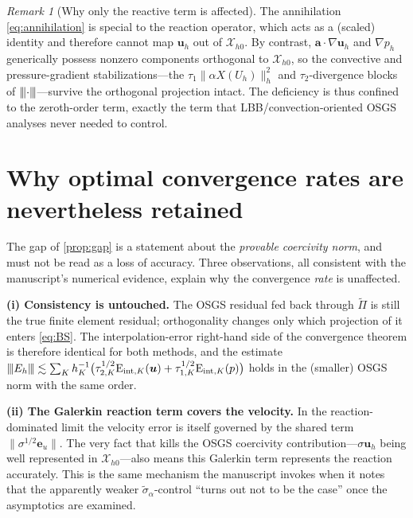 \documentclass[11pt]{article}
\newcommand{\triplenorm}[1]{{\left\vert\kern-0.25ex\left\vert\kern-0.25ex\left\vert #1
\right\vert\kern-0.25ex\right\vert\kern-0.25ex\right\vert}}
\theoremstyle{plain}
\theoremstyle{remark}
\newtheorem{remark}{Remark}
\newcommand{\uh}{\boldsymbol{u}_h}
\newcommand{\ph}{p_h}
\newcommand{\Uh}{U_h}
\newcommand{\Xh}{\mathcal{X}_{h0}}
\newcommand{\Porth}{\widetilde{\Pi}}                  %
\newcommand{\siga}{\widetilde{\sigma}_\alpha}
\begin{document}
\begin{remark}[Why only the reactive term is affected]
The annihilation \eqref{eq:annihilation} is special to the reaction operator,
which acts as a (scaled) identity and therefore cannot map $\uh$ out of $\Xh$. By
contrast, $\boldsymbol{a}\cdot\nabla\uh$ and $\nabla\ph$ generically possess
nonzero components orthogonal to $\Xh$, so the convective and pressure-gradient
stabilizations---the $\tau_1\|\alpha X(\Uh)\|_h^2$ and $\tau_2$-divergence blocks
of $\triplenorm{\cdot}$---survive the orthogonal projection intact. The deficiency
is thus confined to the zeroth-order term, exactly the term that
LBB/convection-oriented OSGS analyses never needed to control.
\end{remark}

\section{Why optimal convergence rates are nevertheless retained}
The gap of \cref{prop:gap} is a statement about the \emph{provable coercivity
norm}, and must not be read as a loss of accuracy. Three observations, all
consistent with the manuscript's numerical evidence, explain why the convergence
\emph{rate} is unaffected.

\smallskip
\noindent\textbf{(i) Consistency is untouched.} The OSGS residual fed back through
$\Porth$ is still the true finite element residual; orthogonality changes only
which projection of it enters \cref{eq:BS}. The interpolation-error right-hand side
of the convergence theorem is therefore identical for both methods, and the
estimate
$
  \triplenorm{E_h}\lesssim\sum_K h_K^{-1}\big(\tau_{2,K}^{1/2}\mathrm{E}_{\text{int},K}(\boldsymbol{u})
  +\tau_{1,K}^{1/2}\mathrm{E}_{\text{int},K}(p)\big)
$
holds in the (smaller) OSGS norm with the same order.

\smallskip
\noindent\textbf{(ii) The Galerkin reaction term covers the velocity.} In the
reaction-dominated limit the velocity error is itself governed by the shared term
$\|\sigma^{1/2}\boldsymbol{e}_u\|$. The very fact that kills the OSGS coercivity
contribution---$\sigma\uh$ being well represented in $\Xh$---also means this
Galerkin term represents the reaction accurately. This is the same mechanism the
manuscript invokes when it notes that the apparently weaker $\siga$-control ``turns
out not to be the case'' once the asymptotics are examined.
\end{document}
